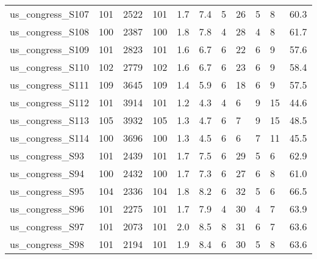 \begin{longtable}{lllllllllll}
 us\_congress\_S107                                   & 101        & 2522      & 101   & 1.7    & 7.4    & 5     & 26     & 5      & 8      & 60.3    \\
 us\_congress\_S108                                   & 100        & 2387      & 100   & 1.8    & 7.8    & 4     & 28     & 4      & 8      & 61.7    \\
 us\_congress\_S109                                   & 101        & 2823      & 101   & 1.6    & 6.7    & 6     & 22     & 6      & 9      & 57.6    \\
 us\_congress\_S110                                   & 102        & 2779      & 102   & 1.6    & 6.7    & 6     & 23     & 6      & 9      & 58.4    \\
 us\_congress\_S111                                   & 109        & 3645      & 109   & 1.4    & 5.9    & 6     & 18     & 6      & 9      & 57.5    \\
 us\_congress\_S112                                   & 101        & 3914      & 101   & 1.2    & 4.3    & 4     & 6      & 9      & 15     & 44.6    \\
 us\_congress\_S113                                   & 105        & 3932      & 105   & 1.3    & 4.7    & 6     & 7      & 9      & 15     & 48.5    \\
 us\_congress\_S114                                   & 100        & 3696      & 100   & 1.3    & 4.5    & 6     & 6      & 7      & 11     & 45.5    \\
 us\_congress\_S93                                    & 101        & 2439      & 101   & 1.7    & 7.5    & 6     & 29     & 5      & 6      & 62.9    \\
 us\_congress\_S94                                    & 100        & 2432      & 100   & 1.7    & 7.3    & 6     & 27     & 6      & 8      & 61.0    \\
 us\_congress\_S95                                    & 104        & 2336      & 104   & 1.8    & 8.2    & 6     & 32     & 5      & 6      & 66.5    \\
 us\_congress\_S96                                    & 101        & 2275      & 101   & 1.7    & 7.9    & 4     & 30     & 4      & 7      & 63.9    \\
 us\_congress\_S97                                    & 101        & 2073      & 101   & 2.0    & 8.5    & 8     & 31     & 6      & 7      & 63.6    \\
 us\_congress\_S98                                    & 101        & 2194      & 101   & 1.9    & 8.4    & 6     & 30     & 5      & 8      & 63.6    \\

\end{longtable}
